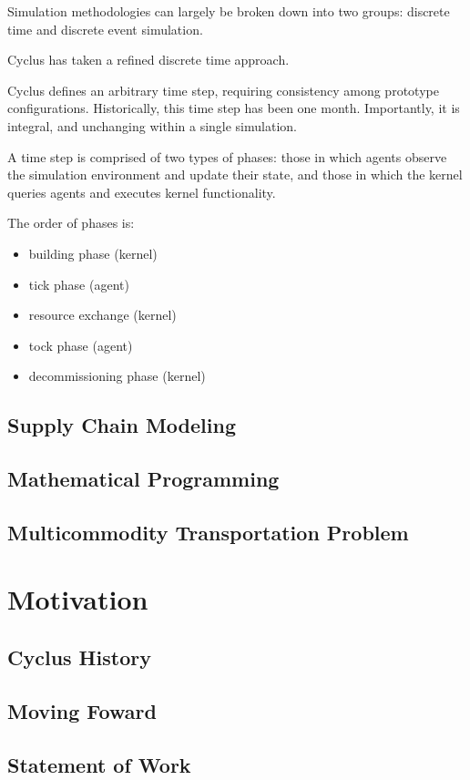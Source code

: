 Simulation methodologies can largely be broken down into two groups: discrete
time and discrete event simulation. 

Cyclus has taken a refined discrete time approach.

Cyclus defines an arbitrary time step, requiring consistency among prototype
configurations. Historically, this time step has been one month. Importantly, it
is integral, and unchanging within a single simulation.

A time step is comprised of two types of phases: those in which agents observe
the simulation environment and update their state, and those in which the kernel
queries agents and executes kernel functionality.

The order of phases is:

\begin{itemize}
  \item building phase (kernel)
  \item tick phase (agent)
  \item resource exchange (kernel)
  \item tock phase (agent)
  \item decommissioning phase (kernel)
\end{itemize}

\subsection{Supply Chain Modeling}

\subsection{Mathematical Programming}

\subsection{Multicommodity Transportation Problem}\label{intro:mtp}

\section{Motivation}

\subsection{Cyclus History}

\subsection{Moving Foward}

\subsection{Statement of Work}
